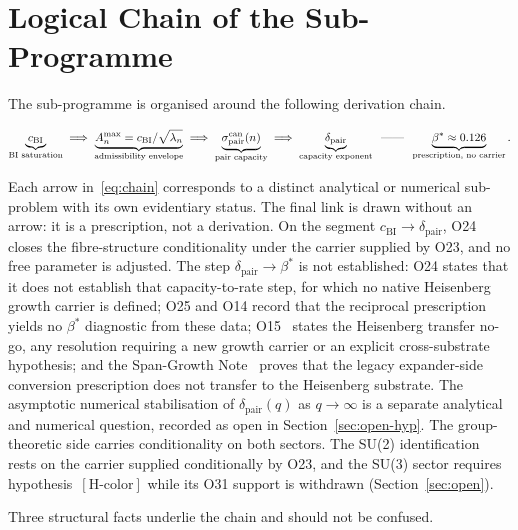\documentclass[11pt,a4paper]{article}
\theoremstyle{definition}
\newcommand{\dimpair}{\delta_{\mathrm{pair}}}
\newcommand{\betastar}{\beta^*}
\newcommand{\cchi}{c_{\mathrm{BI}}}
\newcommand{\spair}{\sigma^{\mathrm{can}}_{\mathrm{pair}}}
\begin{document}
  \section{Logical Chain of the Sub-Programme}
    \label{sec:chain}

    The sub-programme is organised around the following derivation chain.

    {\small
    \begin{equation}
      \label{eq:chain}
      \underbrace{\cchi}_{\text{BI saturation}}
      \;\Longrightarrow\;
      \underbrace{A^{\max}_n = \cchi/\sqrt{\lambda_n}}_{\text{admissibility envelope}}
      \;\Longrightarrow\;
      \underbrace{\spair(n)}_{\text{pair capacity}}
      \;\Longrightarrow\;
      \underbrace{\dimpair}_{\text{capacity exponent}}
      \;\;\text{\textemdash\textemdash}\;\;
      \underbrace{\betastar \approx 0.126}_{\text{prescription, no carrier}}.
    \end{equation}
    }

    Each arrow in~\eqref{eq:chain} corresponds to a distinct analytical or numerical
    sub-problem with its own evidentiary status.
    The final link is drawn without an arrow: it is a prescription, not a derivation.
    On the segment $\cchi \to \dimpair$, O24~\cite{Beau2026a28} closes the fibre-structure
    conditionality under the carrier supplied by O23, and no free parameter is adjusted.
    The step $\dimpair \to \betastar$ is not established: O24 states that it does not establish
    that capacity-to-rate step, for which no native Heisenberg growth carrier is defined; O25 and
    O14 record that the reciprocal prescription yields no $\betastar$ diagnostic from these data;
    O15~\cite{Beau2026a19} states the Heisenberg transfer no-go, any resolution requiring a new
    growth carrier or an explicit cross-substrate hypothesis; and the Span-Growth
    Note~\cite{Beau2026sgn} proves that the legacy expander-side conversion prescription does not transfer to
    the Heisenberg substrate.
    The asymptotic numerical stabilisation of $\dimpair(q)$ as $q \to \infty$ is a
    separate analytical and numerical question, recorded as open in
    Section~\ref{sec:open-hyp}.
    The group-theoretic side carries conditionality on both sectors.
    The SU(2) identification rests on the carrier supplied conditionally by O23, and the SU(3)
    sector requires hypothesis~$[\mathrm{H\text{-}color}]$ while its O31 support is withdrawn
    (Section~\ref{sec:open}).

    \medskip
    Three structural facts underlie the chain and should not be confused.
\end{document}
